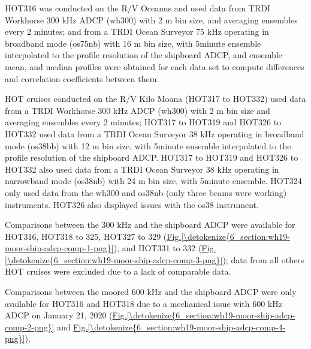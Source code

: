 \documentclass[a4paper,10pt,english,openany,oneside]{sphinxmanual}
\begin{document}
\sphinxAtStartPar
HOT\sphinxhyphen{}316 was conducted on the R/V Oceanus and used data from TRDI Workhorse 300
kHz ADCP (wh300) with 2 m bin size, and averaging ensembles every 2 minutes;
and from a TRDI Ocean Surveyor 75 kHz operating in broadband mode (os75nb) with
16 m bin size, with 5\sphinxhyphen{}minute ensemble interpolated to the profile resolution of
the shipboard ADCP, and ensemble mean, and median profiles were obtained for
each data set to compute differences and correlation coefficients between them.

\sphinxAtStartPar
HOT cruises conducted on the R/V Kilo Moana (HOT\sphinxhyphen{}317 to HOT\sphinxhyphen{}332) used data from
a TRDI Workhorse 300 kHz ADCP (wh300) with 2 m bin size and averaging
ensembles every 2 minutes; HOT\sphinxhyphen{}317 to HOT\sphinxhyphen{}319 and HOT\sphinxhyphen{}326 to HOT\sphinxhyphen{}332
used data from a TRDI Ocean Surveyor 38 kHz operating in broadband mode
(os38bb) with 12 m bin size, with 5\sphinxhyphen{}minute ensemble interpolated to the profile
resolution of the shipboard ADCP. HOT\sphinxhyphen{}317 to HOT\sphinxhyphen{}319 and HOT\sphinxhyphen{}326 to HOT\sphinxhyphen{}332
also used data from a TRDI Ocean Surveyor 38 kHz operating in narrowband mode
(os38nb) with 24 m bin size, with 5\sphinxhyphen{}minute ensemble. HOT\sphinxhyphen{}324 only used data
from the wh300 and os38nb (only three beams were working) instruments. HOT\sphinxhyphen{}326
also displayed issues with the os38 instrument.

\sphinxAtStartPar
Comparisons between the 300 kHz and the shipboard ADCP were available for
HOT\sphinxhyphen{}316, HOT\sphinxhyphen{}318 to \sphinxhyphen{}325, HOT\sphinxhyphen{}327 to \sphinxhyphen{}329
(\hyperref[\detokenize{6_section:wh19-moor-ship-adcp-comp-1-png}]{Fig.\@ \ref{\detokenize{6_section:wh19-moor-ship-adcp-comp-1-png}}}), and HOT\sphinxhyphen{}331 to \sphinxhyphen{}332
(\hyperref[\detokenize{6_section:wh19-moor-ship-adcp-comp-3-png}]{Fig.\@ \ref{\detokenize{6_section:wh19-moor-ship-adcp-comp-3-png}}}); data from all others HOT cruises
were excluded due to a lack of comparable data.

\sphinxAtStartPar
Comparisons between the moored 600 kHz and the shipboard ADCP were only
available for HOT\sphinxhyphen{}316 and HOT\sphinxhyphen{}318 due to a mechanical issue with 600 kHz
ADCP on January 21, 2020 (\hyperref[\detokenize{6_section:wh19-moor-ship-adcp-comp-2-png}]{Fig.\@ \ref{\detokenize{6_section:wh19-moor-ship-adcp-comp-2-png}}} and
\hyperref[\detokenize{6_section:wh19-moor-ship-adcp-comp-4-png}]{Fig.\@ \ref{\detokenize{6_section:wh19-moor-ship-adcp-comp-4-png}}}).
\end{document}
